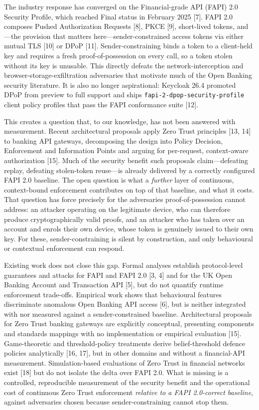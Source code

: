 The industry response has converged on the Financial-grade API (FAPI) 2.0 Security Profile, which reached Final status in February 2025 [7]. FAPI 2.0 composes Pushed Authorization Requests [8], PKCE [9], short-lived tokens, and---the provision that matters here---sender-constrained access tokens via either mutual TLS [10] or DPoP [11]. Sender-constraining binds a token to a client-held key and requires a fresh proof-of-possession on every call, so a token stolen without its key is unusable. This directly defeats the network-interception and browser-storage-exfiltration adversaries that motivate much of the Open Banking security literature. It is also no longer aspirational: Keycloak 26.4 promoted DPoP from preview to full support and ships \texttt{fapi-2-dpop-security-profile} client policy profiles that pass the FAPI conformance suite [12].

This creates a question that, to our knowledge, has not been answered with measurement. Recent architectural proposals apply Zero Trust principles [13, 14] to banking API gateways, decomposing the design into Policy Decision, Enforcement and Information Points and arguing for per-request, context-aware authorization [15]. Much of the security benefit such proposals claim---defeating replay, defeating stolen-token reuse---is already delivered by a correctly configured FAPI 2.0 baseline. The open question is what a \textit{further} layer of continuous, context-bound enforcement contributes on top of that baseline, and what it costs. That question has force precisely for the adversaries proof-of-possession cannot address: an attacker operating on the legitimate device, who can therefore produce cryptographically valid proofs, and an attacker who has taken over an account and enrols their own device, whose token is genuinely issued to their own key. For these, sender-constraining is silent by construction, and only behavioural or contextual enforcement can respond.

Existing work does not close this gap. Formal analyses establish protocol-level guarantees and attacks for FAPI and FAPI 2.0 [3, 4] and for the UK Open Banking Account and Transaction API [5], but do not quantify runtime enforcement trade-offs. Empirical work shows that behavioural features discriminate anomalous Open Banking API access [6], but is neither integrated with nor measured against a sender-constrained baseline. Architectural proposals for Zero Trust banking gateways are explicitly conceptual, presenting components and standards mappings with no implementation or empirical evaluation [15]. Game-theoretic and threshold-policy treatments derive belief-threshold defence policies analytically [16, 17], but in other domains and without a financial-API measurement. Simulation-based evaluations of Zero Trust in financial networks exist [18] but do not isolate the delta over FAPI 2.0. What is missing is a controlled, reproducible measurement of the security benefit and the operational cost of continuous Zero Trust enforcement \textit{relative to a FAPI 2.0-correct baseline}, against adversaries chosen because sender-constraining cannot stop them.

